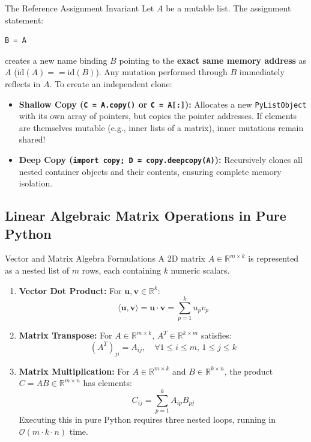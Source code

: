 \begin{theorembox}{The Reference Assignment Invariant}
  
Let $A$ be a mutable list. The assignment statement:
\begin{lstlisting}[language=Python]
B = A
\end{lstlisting}
creates a new name binding $B$ pointing to the \textbf{exact same memory address} as $A$ ($\text{id}(A) == \text{id}(B)$). Any mutation performed through $B$ immediately reflects in $A$.
To create an independent clone:
\begin{itemize}
    \item \textbf{Shallow Copy (\texttt{C = A.copy()} or \texttt{C = A[:]}):} Allocates a new \texttt{PyListObject} with its own array of pointers, but copies the pointer addresses. If elements are themselves mutable (e.g., inner lists of a matrix), inner mutations remain shared!
    \item \textbf{Deep Copy (\texttt{import copy; D = copy.deepcopy(A)}):} Recursively clones all nested container objects and their contents, ensuring complete memory isolation.
\end{itemize}
\end{theorembox}

\subsection{Linear Algebraic Matrix Operations in Pure Python}

\begin{definitionbox}{Vector and Matrix Algebra Formulations}
 
A 2D matrix $A \in \mathbb{R}^{m \times k}$ is represented as a nested list of $m$ rows, each containing $k$ numeric scalars.
\begin{enumerate}
    \item \textbf{Vector Dot Product:} For $\mathbf{u}, \mathbf{v} \in \mathbb{R}^k$:
    \begin{equation}
    \langle \mathbf{u}, \mathbf{v} \rangle = \mathbf{u} \cdot \mathbf{v} = \sum_{p=1}^k u_p v_p
    \end{equation}
    \item \textbf{Matrix Transpose:} For $A \in \mathbb{R}^{m \times k}$, $A^T \in \mathbb{R}^{k \times m}$ satisfies:
    \begin{equation}
    (A^T)_{ji} = A_{ij}, \quad \forall 1 \le i \le m, \, 1 \le j \le k
    \end{equation}
    \item \textbf{Matrix Multiplication:} For $A \in \mathbb{R}^{m \times k}$ and $B \in \mathbb{R}^{k \times n}$, the product $C = AB \in \mathbb{R}^{m \times n}$ has elements:
    \begin{equation}
    C_{ij} = \sum_{p=1}^k A_{ip} B_{pj}
    \end{equation}
    Executing this in pure Python requires three nested loops, running in $\mathcal{O}(m \cdot k \cdot n)$ time.
\end{enumerate}
\end{definitionbox}

